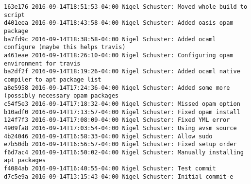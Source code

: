 \begin{lstlisting}
163e176 2016-09-14T18:51:53-04:00 Nigel Schuster: Moved whole build to script
d401eea 2016-09-14T18:43:58-04:00 Nigel Schuster: Added oasis opam package
ba7fd9c 2016-09-14T18:38:58-04:00 Nigel Schuster: Added ocaml configure (maybe this helps travis)
a461eae 2016-09-14T18:26:10-04:00 Nigel Schuster: Configuring opam environment for travis
ba2df2f 2016-09-14T18:19:26-04:00 Nigel Schuster: Added ocaml native compiler to apt package list
a8e5958 2016-09-14T17:24:36-04:00 Nigel Schuster: Added some more (possibly necessary opam packages
c54f5e3 2016-09-14T17:18:32-04:00 Nigel Schuster: Missed opam option
b10adf0 2016-09-14T17:13:57-04:00 Nigel Schuster: Fixed opam install
124f7f3 2016-09-14T17:08:09-04:00 Nigel Schuster: Fixed YML error
4909fa8 2016-09-14T17:03:54-04:00 Nigel Schuster: Using avsm source
4b24046 2016-09-14T16:58:33-04:00 Nigel Schuster: Allow sudo
e7b50db 2016-09-14T16:56:57-04:00 Nigel Schuster: Fixed setup order
f6d7ac4 2016-09-14T16:50:02-04:00 Nigel Schuster: Manually installing apt packages
f4084ab 2016-09-14T16:40:55-04:00 Nigel Schuster: Test commit
d7c5e9a 2016-09-14T13:15:43-04:00 Nigel Schuster: Initial commit-e 

\end{lstlisting}
